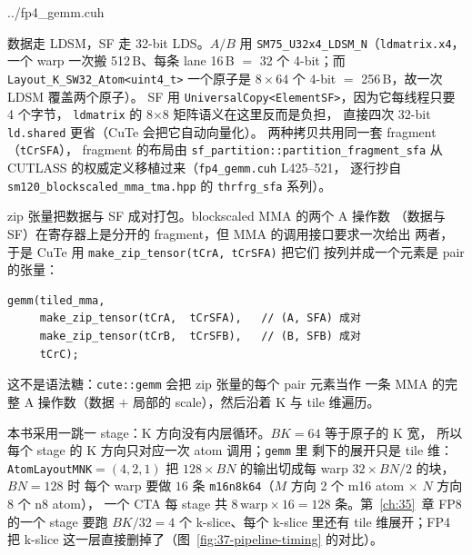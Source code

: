 \begin{lstinputlisting}[linerange={794-817},firstnumber=auto,
  title={fp4\_gemm.cuh L794-817（主循环：四路 s2r + zip 张量 + 一跳一 stage）}]{../fp4_gemm.cuh}
\end{lstinputlisting}

数据走 LDSM，SF 走 32-bit LDS。$A/B$ 用
\texttt{SM75\_U32x4\_LDSM\_N}（\texttt{ldmatrix.x4}，一个 warp 一次搬
512\,B、每条 lane 16\,B $=$ 32 个 4-bit；而
\texttt{Layout\_K\_SW32\_Atom<uint4\_t>} 一个原子是
$8\times64$ 个 4-bit $=$ 256\,B，故一次 LDSM 覆盖两个原子）。
SF 用 \texttt{UniversalCopy<ElementSF>}，因为它每线程只要 4 个字节，
\texttt{ldmatrix} 的 8$\times$8 矩阵语义在这里反而是负担，
直接四次 32-bit \texttt{ld.shared} 更省（CuTe 会把它自动向量化）。
两种拷贝共用同一套 fragment（\texttt{tCrSFA}），
fragment 的布局由 \texttt{sf\_partition::partition\_fragment\_sfa} 从
CUTLASS 的权威定义移植过来（\texttt{fp4\_gemm.cuh} L425--521，
逐行抄自 \texttt{sm120\_blockscaled\_mma\_tma.hpp} 的
\texttt{thrfrg\_sfa} 系列）。

zip 张量把数据与 SF 成对打包。blockscaled MMA 的两个 A 操作数
（数据与 SF）在寄存器上是分开的 fragment，但 MMA 的调用接口要求一次给出
两者，于是 CuTe 用 \texttt{make\_zip\_tensor(tCrA, tCrSFA)} 把它们
按列并成一个元素是 pair 的张量：

\begin{verbatim}
gemm(tiled_mma,
     make_zip_tensor(tCrA,  tCrSFA),   // (A, SFA) 成对
     make_zip_tensor(tCrB,  tCrSFB),   // (B, SFB) 成对
     tCrC);
\end{verbatim}

这不是语法糖：\texttt{cute::gemm} 会把 zip 张量的每个 pair 元素当作
一条 MMA 的完整 A 操作数（数据 $+$ 局部的 scale），然后沿着 K 与
tile 维遍历。

本书采用一跳一 stage：K 方向没有内层循环。$BK{=}64$ 等于原子的 K 宽，
所以每个 stage 的 K 方向只对应一次 atom 调用；\texttt{gemm} 里
剩下的展开只是 tile 维：\texttt{AtomLayoutMNK}$=(4,2,1)$ 把
$128\times BN$ 的输出切成每 warp $32\times BN/2$ 的块，$BN{=}128$ 时
每个 warp 要做 $16$ 条 \texttt{m16n8k64}（$M$ 方向 2 个 m16 atom
$\times$ $N$ 方向 8 个 n8 atom），
一个 CTA 每 stage 共 $8\,\text{warp}\times16 = 128$ 条。第~\ref{ch:35}~章
FP8 的一个 stage 要跑 $BK/32 = 4$ 个 k-slice、每个 k-slice 里还有
tile 维展开；FP4 把 k-slice 这一层直接删掉了（图~\ref{fig:37-pipeline-timing}
的对比）。

